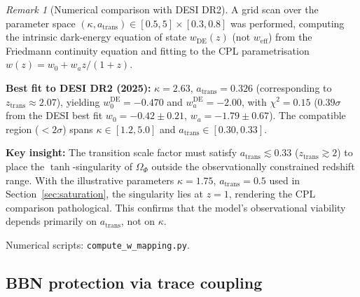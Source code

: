 \documentclass[12pt,a4paper]{article}
\theoremstyle{definition}
\theoremstyle{plain}
\theoremstyle{remark}
\newtheorem{remark}[definition]{Remark}
\begin{document}
\begin{remark}[Numerical comparison with DESI DR2]\label{rem:desi-comparison}
A grid scan over the parameter space $(\kappa, a_{\mathrm{trans}}) \in [0.5, 5] \times [0.3, 0.8]$ was performed, computing the intrinsic dark-energy equation of state $w_{\mathrm{DE}}(z)$ (not $w_{\mathrm{eff}}$) from the Friedmann continuity equation and fitting to the CPL parametrisation $w(z) = w_0 + w_a z/(1+z)$.

\smallskip\noindent\textbf{Best fit to DESI DR2 (2025):} $\kappa = 2.63$, $a_{\mathrm{trans}} = 0.326$ (corresponding to $z_{\mathrm{trans}} \approx 2.07$), yielding $w_0^{\mathrm{DE}} = -0.470$ and $w_a^{\mathrm{DE}} = -2.00$, with $\chi^2 = 0.15$ ($0.39\sigma$ from the DESI best fit $w_0 = -0.42 \pm 0.21$, $w_a = -1.79 \pm 0.67$). The compatible region ($<2\sigma$) spans $\kappa \in [1.2, 5.0]$ and $a_{\mathrm{trans}} \in [0.30, 0.33]$.

\smallskip\noindent\textbf{Key insight:} The transition scale factor must satisfy $a_{\mathrm{trans}} \lesssim 0.33$ ($z_{\mathrm{trans}} \gtrsim 2$) to place the $\tanh$-singularity of $\Omega_\Phi$ outside the observationally constrained redshift range. With the illustrative parameters $\kappa = 1.75$, $a_{\mathrm{trans}} = 0.5$ used in Section~\ref{sec:saturation}, the singularity lies at $z = 1$, rendering the CPL comparison pathological. This confirms that the model's observational viability depends primarily on $a_{\mathrm{trans}}$, not on $\kappa$.

\smallskip\noindent Numerical scripts: \texttt{compute\_w\_mapping.py}.
\end{remark}

\subsection{BBN protection via trace coupling}\label{sec:BBN}
\end{document}
